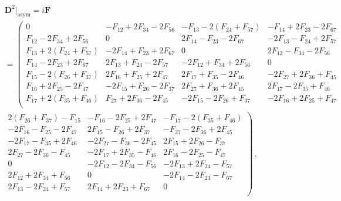 \documentclass[12pt]{article}%
\numberwithin{equation}{section}
\newcommand{\al}[1]{\begin{align}#1\end{align}}
\renewcommand{\(}{\left(}
\renewcommand{\)}{\right)}
\renewcommand{\[}{\left[}
\renewcommand{\]}{\right]}
\begin{document}
\al{& \mathbf D^2|_{\text{asym}} = i \mathbf F \\&= \left(
\begin{array}{cccc}
 0 & -F_{\text{12}}+2 F_{\text{34}}-2 F_{\text{56}} &
   -F_{\text{13}}-2 \left(F_{\text{24}}+F_{\text{57}}\right) &
   -F_{\text{14}}+2 F_{\text{23}}-2 F_{\text{67}} \\
 F_{\text{12}}-2 F_{\text{34}}+2 F_{\text{56}} & 0 & 2
   F_{\text{14}}-F_{\text{23}}-2 F_{\text{67}} & -2
   F_{\text{13}}-F_{\text{24}}+2 F_{\text{57}} \\
 F_{\text{13}}+2 \left(F_{\text{24}}+F_{\text{57}}\right) & -2
   F_{\text{14}}+F_{\text{23}}+2 F_{\text{67}} & 0 & 2
   F_{\text{12}}-F_{\text{34}}-2 F_{\text{56}} \\
 F_{\text{14}}-2 F_{\text{23}}+2 F_{\text{67}} & 2
   F_{\text{13}}+F_{\text{24}}-2 F_{\text{57}} & -2
   F_{\text{12}}+F_{\text{34}}+2 F_{\text{56}} & 0 \\
 F_{\text{15}}-2 \left(F_{\text{26}}+F_{\text{37}}\right) & 2
   F_{\text{16}}+F_{\text{25}}+2 F_{\text{47}} & 2
   F_{\text{17}}+F_{\text{35}}-2 F_{\text{46}} & -2
   F_{\text{27}}+2 F_{\text{36}}+F_{\text{45}} \\
 F_{\text{16}}+2 F_{\text{25}}-2 F_{\text{47}} & -2
   F_{\text{15}}+F_{\text{26}}-2 F_{\text{37}} & 2
   F_{\text{27}}+F_{\text{36}}+2 F_{\text{45}} & 2
   F_{\text{17}}-2 F_{\text{35}}+F_{\text{46}} \\
 F_{\text{17}}+2 \left(F_{\text{35}}+F_{\text{46}}\right) &
   F_{\text{27}}+2 F_{\text{36}}-2 F_{\text{45}} & -2
   F_{\text{15}}-2 F_{\text{26}}+F_{\text{37}} & -2
   F_{\text{16}}+2 F_{\text{25}}+F_{\text{47}} \\
\end{array}
\right.\nonumber\\
&\left.
\begin{array}{ccc}
 2 \left(F_{\text{26}}+F_{\text{37}}\right)-F_{\text{15}} &
   -F_{\text{16}}-2 F_{\text{25}}+2 F_{\text{47}} &
   -F_{\text{17}}-2 \left(F_{\text{35}}+F_{\text{46}}\right) \\
 -2 F_{\text{16}}-F_{\text{25}}-2 F_{\text{47}} & 2
   F_{\text{15}}-F_{\text{26}}+2 F_{\text{37}} &
   -F_{\text{27}}-2 F_{\text{36}}+2 F_{\text{45}} \\
 -2 F_{\text{17}}-F_{\text{35}}+2 F_{\text{46}} & -2
   F_{\text{27}}-F_{\text{36}}-2 F_{\text{45}} & 2
   F_{\text{15}}+2 F_{\text{26}}-F_{\text{37}} \\
 2 F_{\text{27}}-2 F_{\text{36}}-F_{\text{45}} & -2
   F_{\text{17}}+2 F_{\text{35}}-F_{\text{46}} & 2
   F_{\text{16}}-2 F_{\text{25}}-F_{\text{47}} \\
 0 & -2 F_{\text{12}}-2 F_{\text{34}}-F_{\text{56}} & -2
   F_{\text{13}}+2 F_{\text{24}}-F_{\text{57}} \\
 2 F_{\text{12}}+2 F_{\text{34}}+F_{\text{56}} & 0 & -2
   F_{\text{14}}-2 F_{\text{23}}-F_{\text{67}} \\
 2 F_{\text{13}}-2 F_{\text{24}}+F_{\text{57}} & 2
   F_{\text{14}}+2 F_{\text{23}}+F_{\text{67}} & 0 \\
\end{array}
\right)\,.\nonumber
}
\end{document}
